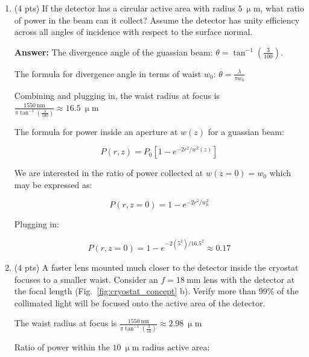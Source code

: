 \documentclass[12pt]{caltech_thesis}
\begin{document}
\begin{enumerate}
\def\labelenumi{\arabic{enumi}.}
\item
  (4 pts) If the detector has a circular active area with radius
  \(5~\mathrm{\upmu m}\), what ratio of power in the beam can it
  collect? Assume the detector has unity efficiency across all angles of
  incidence with respect to the surface normal.

  {\color{midnightblue}  \textbf{Answer:} } {\color{midnightblue}  The
  divergence angle of the guassian beam:
  \(\theta = \tan^{-1}({\frac{3}{100}})\). }

  {\color{midnightblue}  The formula for divergence angle in terms of
  waist \(w_0\): \(\theta = \frac{\lambda}{\pi w_0}\) }

  {\color{midnightblue}  Combining and plugging in, the waist radius at
  focus is
  \(\frac{1550~\mathrm{nm}}{\pi \tan^{-1}(\frac{3}{100})} \approx 16.5~ \mathrm{\upmu m}\)
  }

  {\color{midnightblue}  The formula for power inside an aperture at
  \(w(z)\) for a guassian beam:}

  {\color{midnightblue} 

  \[P(r, z)=P_{0}\left[1-e^{-2 r^{2} / w^{2}(z)}\right]\]

  }

  {\color{midnightblue} We are interested in the ratio of power
  collected at \(w(z=0) = w_0\) which may be expressed as:}

  {\color{midnightblue} 

  \[P(r, z=0)=1-e^{-2 r^{2} / w_0^{2}}\]

  }

  {\color{midnightblue} Plugging in: }

  {\color{midnightblue} 

  \[P(r, z=0)=1-e^{-2(5^{2}) / 16.5^{2}} \approx  \boxed{0.17} \]

  }
\item
  (4 pts) A faster lens mounted much closer to the detector inside the
  cryostat focuses to a smaller waist. Consider an
  \(f = 18~\mathrm{mm}\) lens with the detector at the focal length
  (Fig.~\ref{fig:cryostat_concept} b). Verify more than 99\% of the
  collimated light will be focused onto the active area of the detector.

  {\color{midnightblue}  The waist radius at focus is
  \(\frac{1550~\mathrm{nm}}{\pi \tan^{-1}(\frac{3}{18})} \approx 2.98~\mathrm{\upmu m}\)
  }

  {\color{midnightblue} Ratio of power within the
  \(10~\mathrm{\upmu m}\) radius active area: }


\end{enumerate}
\end{document}
